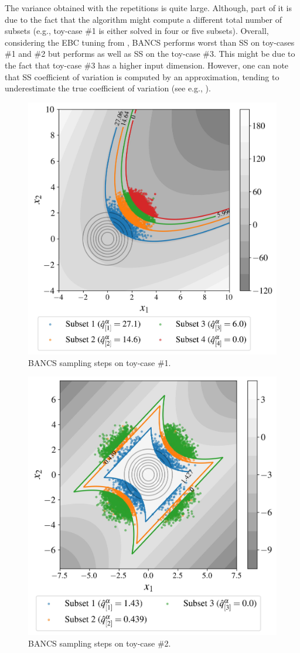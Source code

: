 The variance obtained with the repetitions is quite large. 
Although, part of it is due to the fact that the algorithm might compute a different total number of subsets (e.g., toy-case \#1 is either solved in four or five subsets). 
Overall, considering the EBC tuning from , BANCS performs worst than SS on toy-cases \#1 and \#2 but performs as well as SS on the toy-case \#3. 
This might be due to the fact that toy-case \#3 has a higher input dimension. 
However, one can note that SS coefficient of variation is computed by an approximation, tending to underestimate the true coefficient of variation (see e.g., \cite{Papaioannou_PEM_2015}). 

\begin{figure}
    \centering
    \includegraphics[width=0.6\linewidth]{part3/figures/BANCS/bancs_parabolic2.jpg}
    \caption{BANCS sampling steps on toy-case \#1.}
    \label{fig:toycase1_reliability}
\end{figure}

\begin{figure}
    \centering
    \includegraphics[width=0.6\linewidth]{part3/figures/BANCS/bancs_4branch.jpg}
    \caption{BANCS sampling steps on toy-case \#2.}
    \label{fig:toycase2_reliability}
\end{figure}

